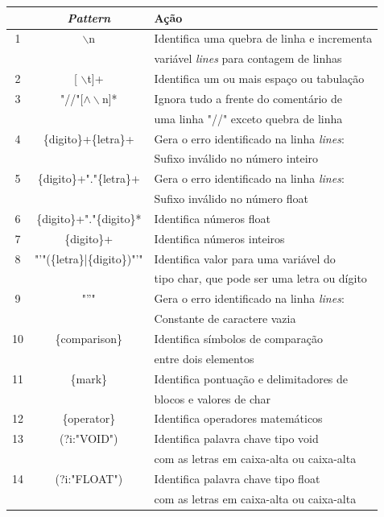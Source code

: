 \documentclass[12pt]{article}
\begin{document}
\begin{table}
 \centering
 \begin{tabular}{|c || c  l |} 
 \hline
   & \textit{Pattern} & Ação \\ [0.5ex] 
 \hline \hline
 1 & $\backslash$n	& Identifica uma quebra de linha e incrementa \\&& variável \textit{lines} para contagem de linhas \\ 
 \hline
 2 & [ $\backslash$t]+ 	& Identifica um ou mais espaço ou tabulação\\
 \hline
 3 & "//"[$\wedge\backslash$n]* & Ignora tudo a frente do comentário de \\&& uma linha "//" exceto quebra de linha \\
 \hline
 4 & \{digito\}+\{letra\}+ & {\color{red}Gera o erro identificado na linha \textit{lines}:} \\&& {\color{red}Sufixo inválido no número inteiro} \\
 \hline
 5 & \{digito\}+"."\{letra\}+& {\color{red}Gera o erro identificado na linha \textit{lines}:} \\&& {\color{red}Sufixo inválido no número float} \\
 \hline
 6 & \{digito\}+"."\{digito\}* & Identifica números float\\
 \hline
 7 & \{digito\}+ & Identifica números inteiros\\
 \hline
 8 & "'"(\{letra\}|\{digito\})"'" & Identifica valor para uma variável do \\&& tipo char, que pode ser uma letra ou dígito\\
 \hline
 9 & "''" & {\color{red}Gera o erro identificado na linha \textit{lines}:} \\&& {\color{red}Constante de caractere vazia} \\
 \hline 
 10 & \{comparison\} & Identifica símbolos de comparação \\&& entre dois elementos \\
 \hline
 11 & \{mark\} & Identifica pontuação e delimitadores de \\&& blocos e valores de char\\
 \hline
 12 & \{operator\} & Identifica operadores matemáticos \\
 \hline
 13 & (?i:"VOID")& Identifica palavra chave tipo void \\&& com as letras em caixa-alta ou caixa-alta \\
 \hline
 14 & (?i:"FLOAT")& Identifica palavra chave tipo float \\&& com as letras em caixa-alta ou caixa-alta \\

\end{tabular}
\end{table}
\end{document}
